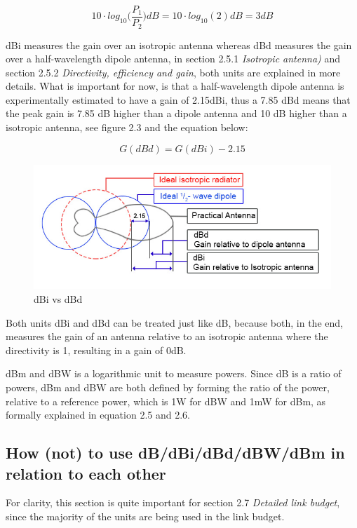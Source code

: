 \begin{equation}
    10 \cdot log_{10}\Big(\frac{P_1}{P_2}\Big)dB = 10 \cdot log_{10}(2)dB = 3dB
\end{equation}

dBi measures the gain over an isotropic antenna whereas dBd measures the gain over a half-wavelength dipole antenna, in section 2.5.1 \textit{Isotropic antenna)} and section 2.5.2 \textit{Directivity, efficiency and gain}, both units are explained in more details. What is important for now, is that a half-wavelength dipole antenna is experimentally estimated to have a gain of 2.15dBi, thus a 7.85 dBd means that the peak gain is 7.85 dB higher than a dipole antenna and 10 dB higher than a isotropic antenna, see figure 2.3 and the equation below:

\begin{equation}
    G(dBd) = G(dBi) - 2.15
\end{equation}

\begin{figure}[h]
\centering
\includegraphics[scale=0.8]{figures/DBIvsDBD.PNG}
\caption{dBi vs dBd \cite{EverythingRF}}
\end{figure}

Both units dBi and dBd can be treated just like dB, because both, in the end, measures the gain of an antenna relative to an isotropic antenna where the directivity is 1, resulting in a gain of 0dB.  

dBm and dBW is a logarithmic unit to measure powers. Since dB is a ratio of powers, dBm and dBW are both defined by forming the ratio of the power, relative to a reference power, which is 1W for dBW and 1mW for dBm, as formally explained in equation 2.5 and 2.6.  

\subsection{How (not) to use dB/dBi/dBd/dBW/dBm in relation to each other}
For clarity, this section is quite important for section 2.7 \textit{Detailed link budget}, since the majority of the units are being used in the link budget.

